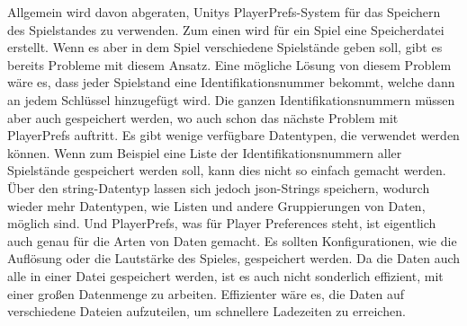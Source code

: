 Allgemein wird davon abgeraten, Unitys PlayerPrefs-System für das Speichern des Spielstandes zu verwenden. Zum einen wird für ein Spiel eine Speicherdatei erstellt. Wenn es aber in dem Spiel verschiedene Spielstände geben soll, gibt es bereits Probleme mit diesem Ansatz. Eine mögliche Lösung von diesem Problem wäre es, dass jeder Spielstand eine Identifikationsnummer bekommt, welche dann an jedem Schlüssel hinzugefügt wird. Die ganzen Identifikationsnummern müssen aber auch gespeichert werden, wo auch schon das nächste Problem mit PlayerPrefs auftritt. Es gibt wenige verfügbare Datentypen, die verwendet werden können. Wenn zum Beispiel eine Liste der Identifikationsnummern aller Spielstände gespeichert werden soll, kann dies nicht so einfach gemacht werden. Über den string-Datentyp lassen sich jedoch \ac{json}-Strings speichern, wodurch wieder mehr Datentypen, wie Listen und andere Gruppierungen von Daten, möglich sind. Und PlayerPrefs, was für Player Preferences steht, ist eigentlich auch genau für die Arten von Daten gemacht. Es sollten Konfigurationen, wie die Auflösung oder die Lautstärke des Spieles, gespeichert werden. Da die Daten auch alle in einer Datei gespeichert werden, ist es auch nicht sonderlich effizient, mit einer großen Datenmenge zu arbeiten. Effizienter wäre es, die Daten auf verschiedene Dateien aufzuteilen, um schnellere Ladezeiten zu erreichen.\cite{unityPersistentData}\cite{logrocketPlayerPrefs}\cite{gamedevbeginnerPlayerPrefs}



